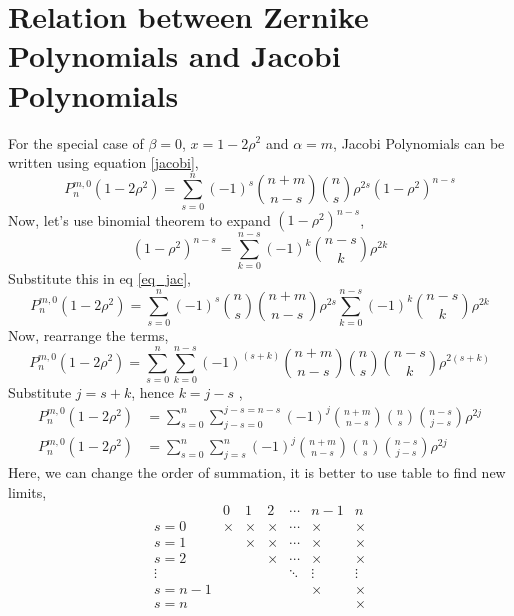 \section{Relation between Zernike Polynomials and Jacobi Polynomials}\label{appedix-2}
For the special case of $\beta=0$, $x=1-2\rho^2$ and $\alpha=m$, Jacobi Polynomials can be written using equation \ref{jacobi},
\begin{equation}
    P_{n}^{m, 0}(1-2\rho^2) = \sum_{s=0}^{n} (-1)^s\binom{n+m}{n-s} \binom{n}{s} \rho^{2s}(1-\rho^2)^{n-s} \label{eq_jac}
\end{equation}
Now, let's use binomial theorem to expand $(1-\rho^2)^{n-s}$,
\begin{equation}
    (1-\rho^2)^{n-s} = \sum_{k=0}^{n-s} (-1)^k \binom{n-s}{k} \rho^{2k}
\end{equation}
Substitute this in eq \ref{eq_jac},
\begin{equation}
    P_{n}^{m, 0}(1-2\rho^2) = \sum_{s=0}^{n} (-1)^s \binom{n}{s} \binom{n+m}{n-s}  \rho^{2s} \sum_{k=0}^{n-s} (-1)^k \binom{n-s}{k} \rho^{2k}
\end{equation}
Now, rearrange the terms,
\begin{equation}
    P_{n}^{m, 0}(1-2\rho^2) = \sum_{s=0}^{n}\sum_{k=0}^{n-s} (-1)^{(s+k)} \binom{n+m}{n-s} \binom{n}{s} \binom{n-s}{k} \rho^{2(s+k)}
\end{equation}
Substitute $j=s+k$, hence $k=j-s$ ,
\begin{align}
    P_{n}^{m, 0}(1-2\rho^2) &= \sum_{s=0}^{n}\sum_{j-s=0}^{j-s=n-s} (-1)^{j} \binom{n+m}{n-s} \binom{n}{s} \binom{n-s}{j-s}\rho^{2j}\\
    P_{n}^{m, 0}(1-2\rho^2) &= \sum_{s=0}^{n}\sum_{j=s}^{n} (-1)^{j} \binom{n+m}{n-s} \binom{n}{s} \binom{n-s}{j-s}\rho^{2j}  
\end{align}
Here, we can change the order of summation, it is better to use table to find new limits,
\[
\begin{array}{c|cccccc}
  & 0 & 1 & 2 & \cdots & n-1 & n \\
\hline
s = 0 & \times & \times & \times & \cdots & \times & \times \\
s = 1 &       & \times & \times & \cdots & \times & \times \\
s = 2 &       &       & \times & \cdots & \times & \times \\
\vdots &       &       &       & \ddots & \vdots & \vdots \\
s = n-1 &       &       &       &       & \times & \times \\
s = n &       &       &       &       &       & \times \\
\end{array}
\]
